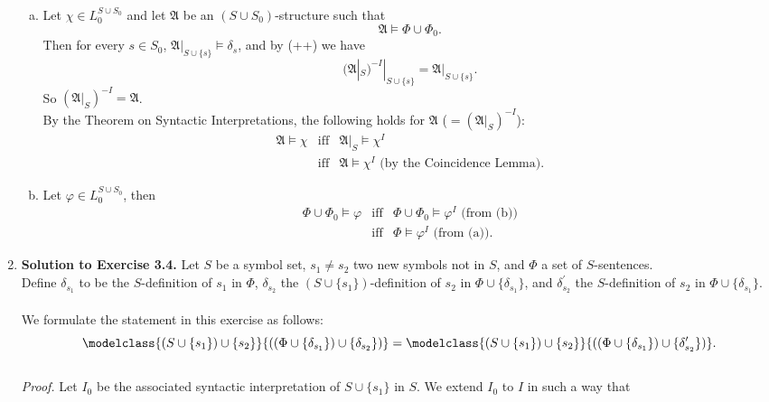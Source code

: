 \begin{enumerate}[1.]
\begin{enumerate}[(a)]
\item Let $\chi \in L_0^{S \cup S_0}$ and let $\mathfrak{A}$ be an $(S \cup S_0)$-structure such that
\[
\mathfrak{A} \models \Phi \cup \Phi_0.
\]
Then for every $s \in S_0$, $\mathfrak{A}|_{S \cup \{ s \}} \models \delta_s$, and by (++) we have
\[
(\mathfrak{A}|_S)^{-I}|_{S \cup \{ s \}} = \mathfrak{A}|_{S \cup \{ s \}}.
\]
So $(\mathfrak{A}|_S)^{-I} = \mathfrak{A}$.
\\
By the Theorem on Syntactic Interpretations, the following holds for $\mathfrak{A}$ ($= (\mathfrak{A}|_S)^{-I}$):
\[
\begin{array}{lll}
\mathfrak{A} \models \chi & \mbox{iff} & \mathfrak{A}|_S \models \chi^I \\
\                         & \mbox{iff} & \mathfrak{A} \models \chi^I \mbox{ (by the Coincidence Lemma).}
\end{array}
\]
\item Let $\varphi \in L_0^{S \cup S_0}$, then
\[
\begin{array}{lll}
\Phi \cup \Phi_0 \models \varphi & \mbox{iff} & \mbox{$\Phi \cup \Phi_0 \models \varphi^I$ (from (b))} \\
\                                & \mbox{iff} & \mbox{$\Phi \models \varphi^I$ (from (a))}.
\end{array}
\]
\end{enumerate}
%
\item \textbf{Solution to Exercise 3.4.} Let $S$ be a symbol set, $s_1 \neq s_2$ two new symbols not in $S$, and $\Phi$ a set of $S$-sentences.
\\
Define $\delta_{s_1}$ to be the $S$-definition of $s_1$ in $\Phi$, $\delta_{s_2}$ the $(S \cup \{ s_1 \})$-definition of $s_2$ in $\Phi \cup \{ \delta_{s_1} \}$, and $\delta^\prime_{s_2}$ the $S$-definition of $s_2$ in $\Phi \cup \{ \delta_{s_1} \}$.
\ 
\\
\\
We formulate the statement in this exercise as follows:
\[
\modelclass{(S \cup \{ s_1 \}) \cup \{ s_2 \}}{((\Phi \cup \{ \delta_{s_1} \}) \cup \{ \delta_{s_2} \})} = \modelclass{(S \cup \{ s_1 \}) \cup \{ s_2 \}}{((\Phi \cup \{ \delta_{s_1} \}) \cup \{ \delta_{s_2}^\prime \})}.
\]
\\
\textit{Proof.} Let $I_0$ be the associated syntactic interpretation of $S \cup \{ s_1 \}$ in $S$. We extend $I_0$ to $I$ in such a way that

\end{enumerate}
